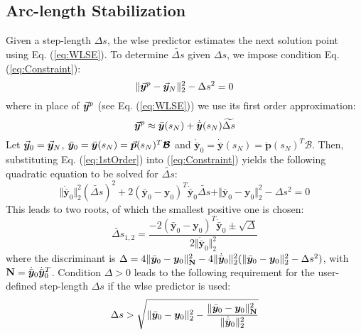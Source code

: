 \subsection{Arc-length Stabilization}\label{CH5-S2SS3}

Given a step-length $\Delta s$, the \acrshort{wlse} predictor estimates the 
next solution point using Eq. (\ref{eq:WLSE}). To determine $\widetilde{\Delta 
s}$ 
given $\Delta s$, we impose condition Eq. (\ref{eq:Constraint}):
\begin{equation}
	\Vert \vec{\bm{y}}^p-\vec{\bm{y}}_N\Vert_2^2-\Delta s^2 = 0
	\label{eq:Constraint}
\end{equation}
where in place of $\vec{\bm{y}}^p$ (see Eq. (\ref{eq:WLSE})) we use its first order 
approximation:
\begin{equation}
	\vec{\bm{y}}^p\approx 
	\bar{\bm{y}}(s_N)+\dot{\bar{\bm{y}}}(s_N)\widetilde{\Delta s}
	\label{eq:1stOrder}
\end{equation}
Let $\vec{\bm{y}}_0=\vec{\bm{y}}_N$, $\bar{\bm{y}}_0 = \bar{\bm{y}}(s_N) =
\vec{\bm{p}}(s_N)^T\bm{\mathcal{B}}$ and $\dot{\bar{\bm{y}}}_0 = 
\dot{\bar{\bm{y}}}(s_N) = \dot{\bm{p}}(s_N)^T\bm{\mathcal{B}}$. Then,
substituting Eq. (\ref{eq:1stOrder}) into (\ref{eq:Constraint}) yields the 
following
quadratic equation to be solved for $\widetilde{\Delta s}$:
\begin{equation}
	\Vert\dot{\bar{\bm{y}}}_0\Vert_2^2(\widetilde{\Delta s})^2+
	2(\bar{\bm{y}}_0-\bm{y}_0)^T\dot{\bar{\bm{y}}}_0 \widetilde{\Delta s}+
	\Vert \bar{\bm{y}}_0-\bm{y}_0\Vert_2^2-\Delta s^2=0
	\label{eq:QUADRATIC_STAB}
\end{equation}
This leads to two roots, of which the smallest positive one is chosen:
\begin{equation}
	\widetilde{\Delta s}_{1,2} =
	\dfrac{-2(\bar{\bm{y}}_0-\bm{y}_0)^T\dot{\bar{\bm{y}}}_0\pm\sqrt{\Delta}}
	{2\Vert\dot{\bar{\bm{y}}}_0\Vert_2^2}
	\label{eq:ROOTS}
\end{equation}
where the discriminant is $\Delta = 4\Vert
\bar{\bm{y}}_0-\bm{y}_0\Vert^2_{\mathbf{N}} -
4\Vert\dot{\bar{\bm{y}}}_0\Vert_2^2(\Vert
\bar{\bm{y}}_0-\bm{y}_0\Vert_2^2-\Delta s^2)$, with $\mathbf{N} = 
\dot{\bar{\bm{y}}}_0\dot{\bar{\bm{y}}}_0^T$. Condition $\Delta > 0$ leads to
the following requirement for the user-defined step-length $\Delta s$ if the
\acrshort{wlse} predictor is used:
\begin{equation}
	\Delta s > \sqrt{\Vert \bar{\bm{y}}_0-\bm{y}_0\Vert_2^2-
		\dfrac{\Vert 
		\bar{\bm{y}}_0-\bm{y}_0\Vert^2_{\mathbf{N}}}{\Vert\dot{\bar{\bm{y}}}_0
			\Vert_2^2}}
	\label{eq:DSREQ}
\end{equation}

